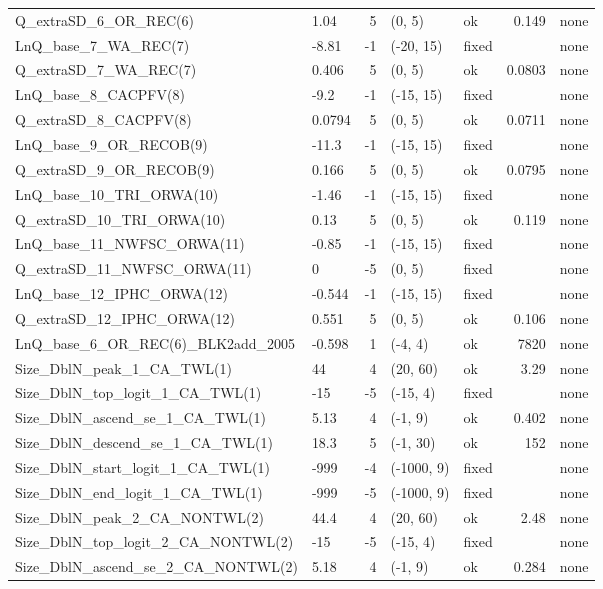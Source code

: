 \documentclass[
]{scrartcl}
\begin{document}
\begin{landscape}
\begin{longtable}{llrllrl}
Q\_extraSD\_6\_OR\_REC(6) & 1.04 & 5 & (0, 5) & ok & 0.149 & none \\ 
LnQ\_base\_7\_WA\_REC(7) & -8.81 & -1 & (-20, 15) & fixed &  & none \\ 
Q\_extraSD\_7\_WA\_REC(7) & 0.406 & 5 & (0, 5) & ok & 0.0803 & none \\ 
LnQ\_base\_8\_CACPFV(8) & -9.2 & -1 & (-15, 15) & fixed &  & none \\ 
Q\_extraSD\_8\_CACPFV(8) & 0.0794 & 5 & (0, 5) & ok & 0.0711 & none \\ 
LnQ\_base\_9\_OR\_RECOB(9) & -11.3 & -1 & (-15, 15) & fixed &  & none \\ 
Q\_extraSD\_9\_OR\_RECOB(9) & 0.166 & 5 & (0, 5) & ok & 0.0795 & none \\ 
LnQ\_base\_10\_TRI\_ORWA(10) & -1.46 & -1 & (-15, 15) & fixed &  & none \\ 
Q\_extraSD\_10\_TRI\_ORWA(10) & 0.13 & 5 & (0, 5) & ok & 0.119 & none \\ 
LnQ\_base\_11\_NWFSC\_ORWA(11) & -0.85 & -1 & (-15, 15) & fixed &  & none \\ 
Q\_extraSD\_11\_NWFSC\_ORWA(11) & 0 & -5 & (0, 5) & fixed &  & none \\ 
LnQ\_base\_12\_IPHC\_ORWA(12) & -0.544 & -1 & (-15, 15) & fixed &  & none \\ 
Q\_extraSD\_12\_IPHC\_ORWA(12) & 0.551 & 5 & (0, 5) & ok & 0.106 & none \\ 
LnQ\_base\_6\_OR\_REC(6)\_BLK2add\_2005 & -0.598 & 1 & (-4, 4) & ok & 7820 & none \\ 
Size\_DblN\_peak\_1\_CA\_TWL(1) & 44 & 4 & (20, 60) & ok & 3.29 & none \\ 
Size\_DblN\_top\_logit\_1\_CA\_TWL(1) & -15 & -5 & (-15, 4) & fixed &  & none \\ 
Size\_DblN\_ascend\_se\_1\_CA\_TWL(1) & 5.13 & 4 & (-1, 9) & ok & 0.402 & none \\ 
Size\_DblN\_descend\_se\_1\_CA\_TWL(1) & 18.3 & 5 & (-1, 30) & ok & 152 & none \\ 
Size\_DblN\_start\_logit\_1\_CA\_TWL(1) & -999 & -4 & (-1000, 9) & fixed &  & none \\ 
Size\_DblN\_end\_logit\_1\_CA\_TWL(1) & -999 & -5 & (-1000, 9) & fixed &  & none \\ 
Size\_DblN\_peak\_2\_CA\_NONTWL(2) & 44.4 & 4 & (20, 60) & ok & 2.48 & none \\ 
Size\_DblN\_top\_logit\_2\_CA\_NONTWL(2) & -15 & -5 & (-15, 4) & fixed &  & none \\ 
Size\_DblN\_ascend\_se\_2\_CA\_NONTWL(2) & 5.18 & 4 & (-1, 9) & ok & 0.284 & none \\ 

\end{longtable}
\end{landscape}
\end{document}
